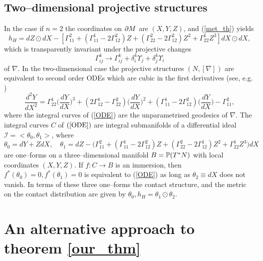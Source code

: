 \koniec

\subsection{Two--dimensional projective structures}
In the case if $n=2$ the coordinates on $\partial M$ are $(X, Y, Z)$,  and (\ref{met_th}) yields
\[
h_{ H }=dZ\odot dX-[\Gamma_{11}^2+(\Gamma_{11}^1-2\Gamma_{12}^2)Z+(\Gamma_{22}^2-2\Gamma_{12}^2)Z^2+
\Gamma_{22}^1Z^3]dX\odot dX,
\]
which is transparently invariant under the projective changes 
\[
\Gamma_{ij}^k\longrightarrow \Gamma_{ij}^k+\delta^k_i\Upsilon_j+\delta^k_j\Upsilon_i
\]
of $\nabla$.
In the  two-dimensional case the 
projective
structures $(N, [\nabla])$ are equivalent to second order ODEs which are cubic in
the first derivatives (see, e.g. \cite{BDE})
\begin{equation}
\label{ODE}
\frac{d^2 Y}{d X^2}=\Gamma^1_{22}\Big(\frac{d Y}{d X}\Big)^3
+(2\Gamma^1_{12}-\Gamma^2_{22})\Big(\frac{d Y}{d X}\Big)^2
+(\Gamma^1_{11}-2\Gamma^2_{12})\Big(\frac{d Y}{d X}\Big)-
\Gamma^2_{11},
\end{equation}
where the integral curves of (\ref{ODE}) are the unparametrised geodesics of $\nabla$. 
The integral curves $C$ of $(\ref{ODE})$ are integral submanifolds
of a  differential
ideal ${\mathcal I}=<\theta_0, \theta_1>$, where
\[
\theta_0=dY+ZdX, \quad \theta_1=dZ-\Big(\Gamma_{11}^2+(\Gamma_{11}^1-2\Gamma_{12}^2)Z+(\Gamma_{22}^2-2\Gamma_{12}^1)Z^2+
\Gamma_{22}^1Z^3\Big)dX
\]
are one--forms on a three--dimensional manifold $B=\mathbb{P}(T^*N)$ with local coordinates $(X, Y, Z)$. If $f:C\rightarrow B$ is an immersion, then $f^*(\theta_0)=0, f^*(\theta_1)=0$ is equivalent
to (\ref{ODE}) as long as $\theta_2\equiv dX$ does not vanish. In terms of these three one--forms
the contact structure, and the metric on the contact distribution are given by
$
\theta_0,  h_{ H }=\theta_1\odot\theta_2.
$

\section{An alternative approach to theorem \ref{our_thm}}


